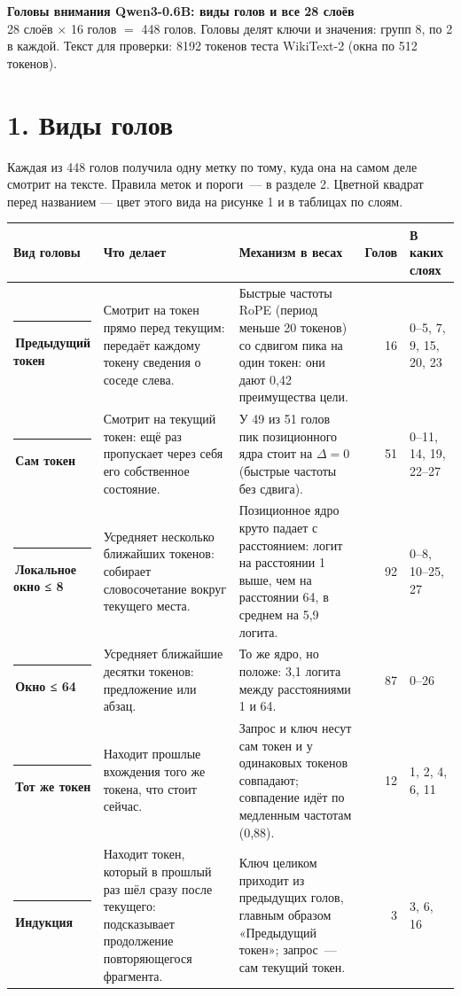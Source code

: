 \documentclass[10pt]{article}
\begin{document}
{\LARGE\bfseries Головы внимания Qwen3-0.6B: виды голов и все 28 слоёв}\\[0.2em]
{\color{ink2} 28 слоёв $\times$ 16 голов $=$ 448 голов. Головы делят ключи и значения: групп 8, по 2 в каждой. Текст для проверки: 8192 токенов теста WikiText-2 (окна по 512 токенов).}

\section*{1. Виды голов}
Каждая из 448 голов получила одну метку по тому, куда она на самом деле смотрит на тексте. Правила меток и пороги~— в разделе 2. Цветной квадрат перед названием — цвет этого вида на рисунке 1 и в таблицах по слоям.
\begin{center}{\small\begin{tabular}{|p{4.3cm}|p{8.9cm}|p{7.3cm}|r|p{3.0cm}|}
\hline
\rowcolor{head}\textbf{Вид головы} & \textbf{Что делает} & \textbf{Механизм в весах} & \textbf{Голов} & \textbf{В каких слоях} \\ \hline
\textcolor[HTML]{2A78D6}{\rule{0.62em}{0.62em}}\,\textbf{Предыдущий токен} & Смотрит на токен прямо перед текущим: передаёт каждому токену сведения о соседе слева. & Быстрые частоты RoPE (период меньше 20 токенов) со сдвигом пика на один токен: они дают 0,42 преимущества цели. & 16 & \mbox{0–5}, 7, 9, 15, 20, 23 \\ \hline
\textcolor[HTML]{2A78D6}{\rule{0.62em}{0.62em}}\,\textbf{Сам токен} & Смотрит на текущий токен: ещё раз пропускает через себя его собственное состояние. & У 49 из 51 голов пик позиционного ядра стоит на $\Delta{=}0$ (быстрые частоты без сдвига). & 51 & \mbox{0–11}, 14, 19, \mbox{22–27} \\ \hline
\textcolor[HTML]{1BAF7A}{\rule{0.62em}{0.62em}}\,\textbf{Локальное окно ≤ 8} & Усредняет несколько ближайших токенов: собирает словосочетание вокруг текущего места. & Позиционное ядро круто падает с расстоянием: логит на расстоянии 1 выше, чем на расстоянии 64, в среднем на 5,9 логита. & 92 & \mbox{0–8}, \mbox{10–25}, 27 \\ \hline
\textcolor[HTML]{EDA100}{\rule{0.62em}{0.62em}}\,\textbf{Окно ≤ 64} & Усредняет ближайшие десятки токенов: предложение или абзац. & То же ядро, но положе: 3,1 логита между расстояниями 1 и 64. & 87 & \mbox{0–26} \\ \hline
\textcolor[HTML]{E87BA4}{\rule{0.62em}{0.62em}}\,\textbf{Тот же токен} & Находит прошлые вхождения того же токена, что стоит сейчас. & Запрос и ключ несут сам токен и у одинаковых токенов совпадают; совпадение идёт по медленным частотам (0,88). & 12 & 1, 2, 4, 6, 11 \\ \hline
\textcolor[HTML]{008300}{\rule{0.62em}{0.62em}}\,\textbf{Индукция} & Находит токен, который в прошлый раз шёл сразу после текущего: подсказывает продолжение повторяющегося фрагмента. & Ключ целиком приходит из предыдущих голов, главным образом «Предыдущий токен»; запрос~— сам текущий токен. & 3 & 3, 6, 16 \\ \hline


\end{tabular}}
\end{center}
\end{document}
